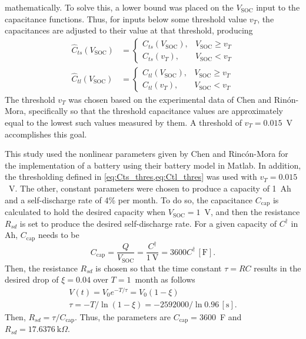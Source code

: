 \documentclass[../zhang_thesis.tex]{subfiles}
\begin{document}
mathematically. To solve this, a lower bound was placed on the $V_\text{SOC}$ input to the capacitance functions. Thus, for inputs below some threshold value $v_T$, the capacitances are adjusted to their value at that threshold, producing
\begin{align}
    \hat{C}_{ts}(V_\text{SOC}) &= \begin{cases}
        C_{ts}(V_\text{SOC}), & V_\text{SOC} \ge v_T \\
        C_{ts}(v_T), & V_\text{SOC} < v_T
        \end{cases} \label{eq:Cts_thres} \\
    \hat{C}_{tl}(V_\text{SOC}) &= \begin{cases}
        C_{tl}(V_\text{SOC}), & V_\text{SOC} \ge v_T \\
        C_{tl}(v_T), & V_\text{SOC} < v_T \label{eq:Ctl_thres}
        \end{cases}
\end{align}
The threshold $v_T$ was chosen based on the experimental data of Chen and Rin\'on-Mora, specifically so that the threshold capacitance values are approximately equal to the lowest such values measured by them. A threshold of $v_T=0.015$~V accomplishes this goal.

This study used the nonlinear parameters given by Chen and Rinc\'on-Mora for the implementation of a battery using their battery model in Matlab. In addition, the thresholding defined in \cref{eq:Cts_thres,eq:Ctl_thres} was used with $v_T=0.015$~V. The other, constant parameters were chosen to produce a capacity of 1~Ah and a self-discharge rate of 4\% per month. To do so, the capacitance $C_\text{cap}$ is calculated to hold the desired capacity
when $V_\text{SOC}=1$~V, and then the resistance $R_{sd}$ is set to produce the desired self-discharge rate. For a given capacity of $C^\dag$ in Ah, $C_\text{cap}$ needs to be
\begin{equation}
    C_\text{cap} = \frac{Q}{V_\text{SOC}} = \frac{C^\dag}{1~\text{V}} = 3600 C^\dag \,[\text{F}].
\end{equation}
Then, the resistance $R_{sd}$ is chosen so that the time constant $\tau=RC$ results in the desired drop of $\xi=0.04$ over $T=1$~month as follows
\begin{gather}
    V(t) = V_0 e^{-T/\tau} = V_0 (1-\xi) \\
    \tau = -T/\ln(1-\xi) = -2592000/\ln 0.96 \,[\text{s}].
\end{gather}
Then, $R_{sd}=\tau/C_\text{cap}$. Thus, the parameters are $C_\text{cap}=3600$~F and $R_{sd}=17.6376~\mathrm{k}\Omega$.
\end{document}
